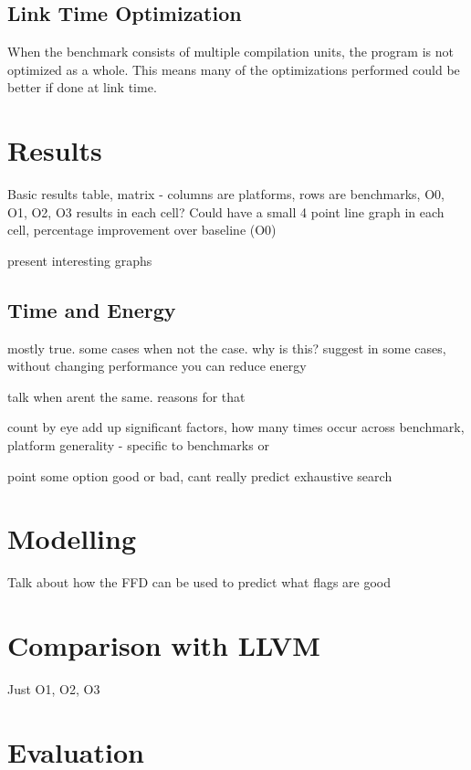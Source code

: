 \documentclass[twocolumn]{article}
\begin{document}
\subsection*{Link Time Optimization}

When the benchmark consists of multiple compilation units, the program is not optimized as a whole. This means many of the optimizations performed could be better if done at link time.

\section*{Results}

Basic results table, matrix - columns are platforms, rows are benchmarks, O0, O1, O2, O3 results in each cell?
Could have a small 4 point line graph in each cell, percentage improvement over baseline (O0)

present interesting graphs

\subsection*{Time and Energy}

mostly true.
some cases when not the case. why is this?
suggest in some cases, without changing performance you can reduce energy

talk when arent the same.
reasons for that


count
by eye add up significant factors, how many times occur across benchmark, platform
generality - specific to benchmarks or

point some option good or bad, cant really predict
exhaustive search

\section*{Modelling}

Talk about how the FFD can be used to predict what flags are good

\section*{Comparison with LLVM}

Just O1, O2, O3


\section*{Evaluation}
\end{document}
